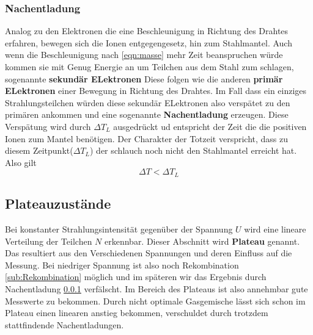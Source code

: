 \subsubsection{Nachentladung}
\label{sub:Nachentladung}
Analog zu den Elektronen die eine Beschleunigung in Richtung des Drahtes erfahren, bewegen sich die Ionen entgegengesetz, hin zum Stahlmantel.
Auch wenn die Beschleunigung nach \eqref{eqn:masse} mehr Zeit beanspruchen würde kommen sie mit Genug Energie an um Teilchen aus dem Stahl zum schlagen, sogenannte \textbf{sekundär ELektronen}
Diese folgen wie die anderen \textbf{primär ELektronen} einer Bewegung in Richtung des Drahtes. Im Fall dass ein einziges Strahlungsteilchen würden diese sekundär ELektronen also verspätet zu den primären ankommen
und eine sogenannte \textbf{Nachentladung} erzeugen. Diese Verspätung wird durch $\Delta T_L$ ausgedrückt ud entspricht der Zeit die die positiven Ionen zum Mantel benötigen.
Der Charakter der Totzeit verspricht, dass zu diesem Zeitpunkt($\Delta T_L$) der schlauch noch nicht den Stahlmantel erreicht hat. Also gilt
\begin{equation*}
\label{eqn:vergleich}
\Delta T < \Delta T_L
\end{equation*}

\subsection{Plateauzustände}
Bei konstanter Strahlungsintensität gegenüber der Spannung $U$ wird eine lineare Verteilung der Teilchen $N$ erkennbar. Dieser Abschnitt wird 
\textbf{Plateau} genannt. Das resultiert aus den Verschiedenen Spannungen und deren Einfluss auf die Messung. Bei niedriger Spannung ist also noch Rekombination \ref{sub:Rekombination} möglich und im späteren wir das Ergebnis durch Nachentladung \ref{sub:Nachentladung} verfälscht. 
Im Bereich des Plateaus ist also annehmbar gute Messwerte zu bekommen. Durch nicht optimale Gasgemische lässt sich schon im Plateau einen linearen anstieg bekommen,
verschuldet durch trotzdem stattfindende Nachentladungen.


